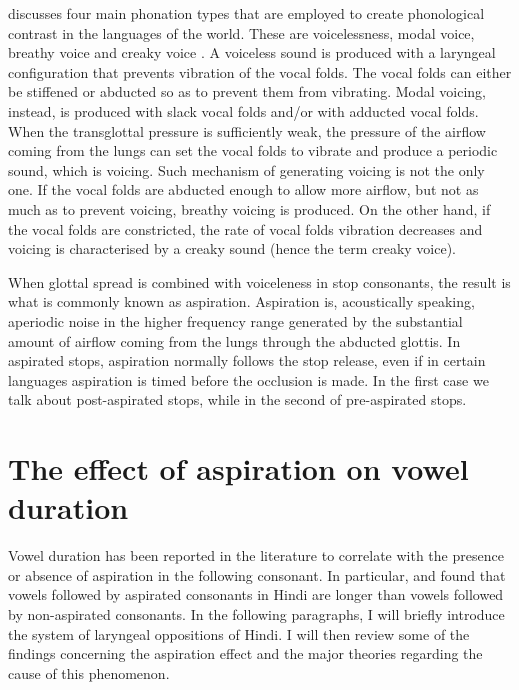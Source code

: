 \documentclass[11pt,a4paper,oneside,openany]{memoir}\usepackage[]{graphicx}\usepackage[]{color}
\begin{document}
\citet{ladefoged1973} discusses four main phonation types that are employed to create phonological contrast in the languages of the world.
These are voicelessness, modal voice, breathy voice and creaky voice \citep{halle2002}.
A voiceless sound is produced with a laryngeal configuration that prevents vibration of the vocal folds.
The vocal folds can either be stiffened or abducted so as to prevent them from vibrating.
Modal voicing, instead, is produced with slack vocal folds and/or with adducted vocal folds.
When the transglottal pressure is sufficiently weak, the pressure of the airflow coming from the lungs can set the vocal folds to vibrate and produce a periodic sound, which is voicing.
Such mechanism of generating voicing is not the only one.
If the vocal folds are abducted enough to allow more airflow, but not as much as to prevent voicing, breathy voicing is produced.
On the other hand, if the vocal folds are constricted, the rate of vocal folds vibration decreases and voicing is characterised by a creaky sound (hence the term creaky voice).

When glottal spread is combined with voiceleness in stop consonants, the result is what is commonly known as aspiration.
Aspiration is, acoustically speaking, aperiodic noise in the higher frequency range generated by the substantial amount of airflow coming from the lungs through the abducted glottis.
In aspirated stops, aspiration normally follows the stop release, even if in certain languages aspiration is timed before the occlusion is made.
In the first case we talk about post-aspirated stops, while in the second of pre-aspirated stops.


\section{The effect of aspiration on vowel duration}
\label{s:aspiration}

Vowel duration has been reported in the literature to correlate with the presence or absence of aspiration in the following consonant.
In particular, \citet{maddieson1976} and \citet{durvasula2012} found that vowels followed by aspirated consonants in Hindi are longer than vowels followed by non-aspirated consonants.
In the following paragraphs, I will briefly introduce the system of laryngeal oppositions of Hindi.
I will then review some of the findings concerning the aspiration effect and the major theories regarding the cause of this phenomenon.
\end{document}
